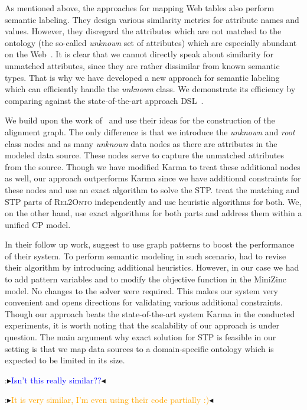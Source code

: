 \documentclass[letterpaper]{article} %
\newcommand{\authornote}[3]{
  {\fbox{\sc 
  #1}:$\blacktriangleright$\textcolor{#2}{\small{#3}}$\blacktriangleleft$}%
}
\newcommand{\ddg}[1]{\authornote{DDG}{blue}{#1}}
\newcommand{\npr}[1]{\authornote{NPR}{orange}{#1}}
\newcommand{\relonto}{\textsc{Rel2Onto}}
\begin{document}
As mentioned above, the approaches for mapping Web tables also perform semantic labeling.
They design various similarity metrics for attribute names and values.
However, they disregard the attributes which are not matched to the ontology (the so-called \emph{unknown} set of attributes) which are especially abundant on the Web~\cite{Ritze:matching}\cite{Pham:semantic}.
It is clear that we cannot directly speak about similarity for unmatched attributes, since they are rather dissimilar from known semantic types.
That is why we have developed a new approach for semantic labeling which can efficiently handle the \emph{unknown} class.
We demonstrate its efficiency by comparing against the state-of-the-art approach DSL~\cite{Pham:semantic}.

We build upon the work of~\cite{taheriyan2016learning} and use their ideas for the construction of the alignment graph.
The only difference is that we introduce the \emph{unknown} and \emph{root} class nodes and as many \emph{unknown} data nodes as there are attributes in the modeled data source.
These nodes serve to capture the unmatched attributes from the source.
Though we have modified Karma to treat these additional nodes as well, our approach outperforms Karma since we have additional constraints for these nodes and use an exact algorithm to solve the STP.
\cite{taheriyan2016learning} treat the matching and STP parts of \relonto{} independently and use heuristic algorithms for both.
We, on the other hand, use exact algorithms for both parts and address them within a unified CP model.

In their follow up work, \cite{Taheriyan:Leveraging} suggest to use graph patterns to boost the performance of their system.
To perform semantic modeling in such scenario, \cite{Taheriyan:Leveraging} had to revise their algorithm by introducing additional heuristics.
However, in our case we had to add pattern variables and to modify the objective function in the MiniZinc model.
No changes to the solver were required.
This makes our system very convenient and opens directions for validating various additional constraints.
Though our approach beats the state-of-the-art system Karma in the conducted experiments, it is worth noting that the scalability of our approach is under question.
The main argument why exact solution for STP is feasible in our setting is that we map data sources to a domain-specific ontology which is expected to be limited in its size.

\ddg{Isn't this really similar??}
\npr{It is very similar, I'm even using their code partially :)}
\end{document}
